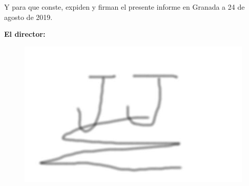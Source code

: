 Y para que conste, expiden y firman el presente informe en Granada a 24 de agosto de 2019.


\textbf{El director:}

\begin{figure}[h]
	\centering
	\includegraphics[scale=0.2]{images/firma2}
\end{figure}